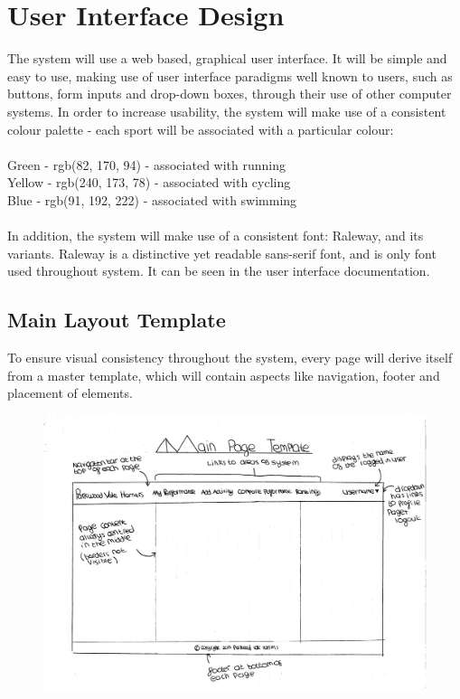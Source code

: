 \documentclass{article}[12pt,a4paper]
\begin{document}
\section{User Interface Design}
The system will use a web based, graphical user interface. It will be simple and easy to use, making use of user interface paradigms well known to users, such as buttons, form inputs and drop-down boxes, through their use of other computer systems. In order to increase usability, the system will make use of a consistent colour palette - each sport will be associated with a particular colour:
\\\\\textcolor{uigreen}{Green - rgb(82, 170, 94) - associated with running}
\\\textcolor{uiyellow}{Yellow - rgb(240, 173, 78) - associated with cycling}
\\\textcolor{uiblue}{Blue - rgb(91, 192, 222) - associated with swimming}
\\\\In addition, the system will make use of a consistent font: Raleway, and its variants. Raleway is a distinctive yet readable sans-serif font, and is only font used throughout system. It can be seen in the user interface documentation.

\subsection{Main Layout Template}
To ensure visual consistency throughout the system, every page will derive itself from a master template, which will contain aspects like navigation, footer and placement of elements.

\begin{figure}[h!]
  \includegraphics[scale=0.45]{design_ui/layout}
\end{figure}
\clearpage
\end{document}
